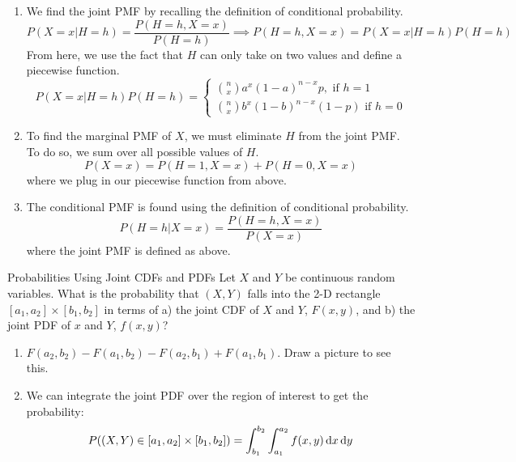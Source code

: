 \documentclass[11.5pt]{article}
\begin{document}
\begin{solution}{4}
\begin{enumerate}
    \item We find the joint PMF by recalling the definition of conditional probability. 
    $$P(X = x | H=h) = \frac{P(H=h, X=x)}{P(H=h)}\implies P(H=h, X=x) = P(X=x|H=h)P(H=h)$$
    From here, we use the fact that $H$ can only take on two values and define a piecewise function. 
    $$ 
    P(X=x|H=h)P(H=h) = \begin{cases}
    {n \choose x}a^x(1-a)^{n-x}p, \text { if } h =1\\
    {n \choose x}b^x(1-b)^{n-x}(1-p) \text{ if } h = 0 
    \end{cases}
    $$
    \item To find the marginal PMF of $X$, we must eliminate $H$ from the joint PMF. To do so, we sum over all possible values of $H$. 
    $$P(X=x) = 
    P(H=1, X=x) + P(H=0, X=x) 
    $$
    where we plug in our piecewise function from above. 
    \item The conditional PMF is found using the definition of conditional probability. 
    $$P(H=h | X=x)  = \frac{P(H=h, X=x)}{P(X=x)}
    $$
    where the joint PMF is defined as above. 
\end{enumerate}
\end{solution}

\begin{exercise}{Probabilities Using Joint CDFs and PDFs}
Let $X$ and $Y$ be continuous random variables. What is the probability that $(X, Y)$ falls into the 2-D rectangle $[a_1, a_2] \times [b_1, b_2]$ in terms of a) the joint CDF of $X$ and $Y$, $F(x, y)$, and b) the joint PDF of $x$ and $Y$, $f(x, y)$?
\end{exercise}

\begin{solution}{4}
\vspace{-5mm}
\begin{enumerate}
\item $F(a_2, b_2) - F(a_1, b_2) - F(a_2, b_1) + F(a_1, b_1)$. Draw a picture to see this.
\item We can integrate the joint PDF over the region of interest to get the probability:
$$P\paren{(X, Y) \in [a_1, a_2] \times [b_1, b_2]} = \int_{b_1}^{b_2} \int_{a_1}^{a_2} f(x, y) \diff x \diff y$$
\end{enumerate}
\end{solution}
\end{document}
